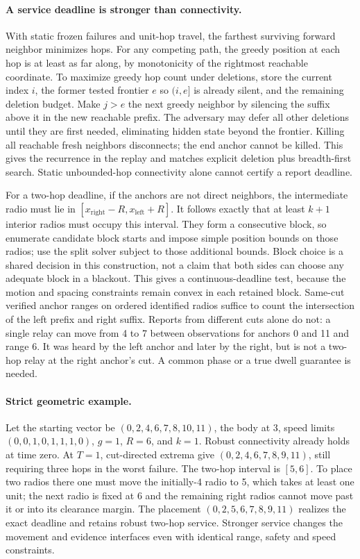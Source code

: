 \documentclass[11pt]{article}
\begin{document}
\paragraph{A service deadline is stronger than connectivity.}
With static frozen failures and unit-hop travel, the farthest surviving
forward neighbor minimizes hops. For any competing path, the greedy
position at each hop is at least as far along, by monotonicity of the
rightmost reachable coordinate. To maximize greedy hop count under
deletions, store the current index $i$, the former tested frontier $e$
so $(i,e]$ is already silent, and the remaining deletion budget. Make
$j>e$ the next greedy neighbor by silencing the suffix above it in the
new reachable prefix. The adversary may defer all other deletions until
they are first needed, eliminating hidden state beyond the frontier.
Killing all reachable fresh neighbors disconnects; the end anchor cannot
be killed. This gives the recurrence in the replay and matches explicit
deletion plus breadth-first search. Static unbounded-hop connectivity
alone cannot certify a report deadline.

For a two-hop deadline, if the anchors are not direct neighbors, the
intermediate radio must lie in
$[x_{\mathrm{right}}-R,x_{\mathrm{left}}+R]$. It follows exactly that at
least $k+1$ interior radios must occupy this interval. They form a
consecutive block, so enumerate candidate block starts and impose
simple position bounds on those radios; use the split solver subject
to those additional bounds. Block choice is a shared decision in this
construction, not a claim that both sides can choose any adequate block
in a blackout. This gives a continuous-deadline test, because the motion
and spacing constraints remain convex in each retained block. Same-cut
verified anchor ranges on ordered identified radios suffice to count
the intersection of the left prefix and right suffix. Reports from
different cuts alone do not: a single relay can move from 4 to 7 between
observations for anchors 0 and 11 and range 6. It was heard by the left
anchor and later by the right, but is not a two-hop relay at the right
anchor's cut. A common phase or a true dwell guarantee is needed.

\paragraph{Strict geometric example.}
Let the starting vector be $(0,2,4,6,7,8,10,11)$, the body at 3, speed
limits $(0,0,1,0,1,1,1,0)$, $g=1$, $R=6$, and $k=1$. Robust connectivity
already holds at time zero. At $T=1$, cut-directed extrema give
$(0,2,4,6,7,8,9,11)$, still requiring three hops in the worst failure.
The two-hop interval is $[5,6]$. To place two radios there one must
move the initially-4 radio to 5, which takes at least one unit; the
next radio is fixed at 6 and the remaining right radios cannot move
past it or into its clearance margin. The placement
$(0,2,5,6,7,8,9,11)$ realizes the exact deadline and retains robust
two-hop service. Stronger service changes the movement and evidence
interfaces even with identical range, safety and speed constraints.
\end{document}
